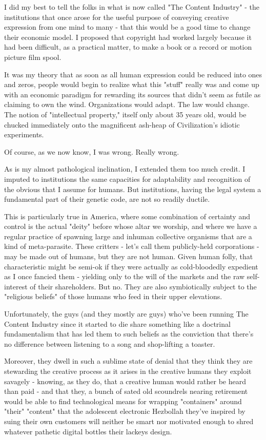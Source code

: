 I did my best to tell the folks in what is now called "The Content
Industry" - the institutions that once arose for the useful purpose
of conveying creative expression from one mind to many - that this
would be a good time to change their economic model. I proposed
that copyright had worked largely because it had been difficult, as
a practical matter, to make a book or a record or motion picture
film spool.

It was my theory that as soon as all human expression could be
reduced into ones and zeros, people would begin to realize what
this "stuff" really was and come up with an economic paradigm for
rewarding its sources that didn't seem as futile as claiming to own
the wind. Organizations would adapt. The law would change. The
notion of "intellectual property," itself only about 35 years old,
would be chucked immediately onto the magnificent ash-heap of
Civilization's idiotic experiments.

Of course, as we now know, I was wrong. Really wrong.

As is my almost pathological inclination, I extended them too much
credit. I imputed to institutions the same capacities for
adaptability and recognition of the obvious that I assume for
humans. But institutions, having the legal system a fundamental
part of their genetic code, are not so readily ductile.

This is particularly true in America, where some combination of
certainty and control is the actual "deity" before whose altar we
worship, and where we have a regular practice of spawning large and
inhuman collective organisms that are a kind of meta-parasite.
These critters - let's call them publicly-held corporations - may
be made out of humans, but they are not human. Given human folly,
that characteristic might be semi-ok if they were actually as
cold-bloodedly expedient as I once fancied them - yielding only to
the will of the markets and the raw self-interest of their
shareholders. But no. They are also symbiotically subject to the
"religious beliefs" of those humans who feed in their upper
elevations.

Unfortunately, the guys (and they mostly are guys) who've been
running The Content Industry since it started to die share
something like a doctrinal fundamentalism that has led them to such
beliefs as the conviction that there's no difference between
listening to a song and shop-lifting a toaster.

Moreover, they dwell in such a sublime state of denial that they
think they are stewarding the creative process as it arises in the
creative humans they exploit savagely - knowing, as they do, that a
creative human would rather be heard than paid - and that they, a
bunch of sated old scoundrels nearing retirement would be able to
find technological means for wrapping "containers" around "their"
"content" that the adolescent electronic Hezbollah they've inspired
by suing their own customers will neither be smart nor motivated
enough to shred whatever pathetic digital bottles their lackeys
design.

